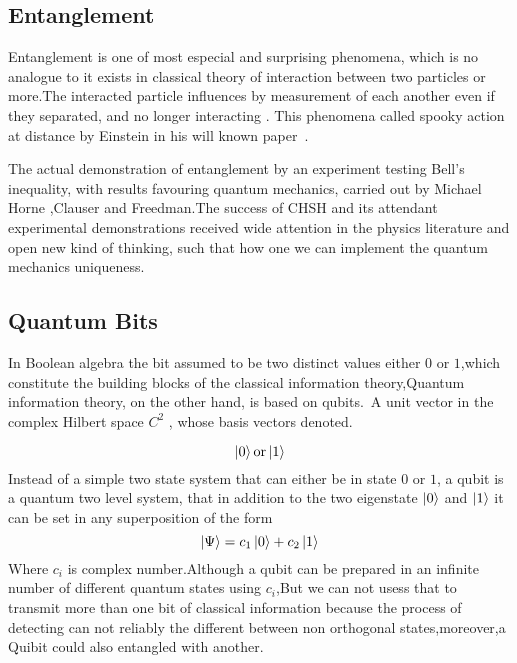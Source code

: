 \subsection{Entanglement}


Entanglement is one of most especial and surprising phenomena, which is no analogue to it exists in classical theory of  interaction between two particles or more\citep{PhysRevLett.78.5022}.The interacted particle influences by measurement of each another even if they separated,  and no longer interacting . This phenomena  called spooky action at distance by Einstein in his will known paper~\cite{EPR}.


The actual demonstration of entanglement by an experiment testing Bell’s inequality, with results favouring quantum mechanics, carried out by Michael Horne ,Clauser and Freedman\citep{PhysRevLett.23.880}.The success of CHSH and its attendant experimental demonstrations received wide attention in the physics literature and open new kind of thinking, such that how one we can implement the quantum mechanics uniqueness.
\subsection{Quantum Bits}

In Boolean algebra the bit assumed to be  two distinct values either $0 $ or $1$,which constitute the building blocks of the classical information theory,Quantum information theory, on the other hand, is based on qubits.\citep{nielsen2002quantum}~A unit vector in the  complex Hilbert space $C^2$ , whose basis vectors denoted.

\begin{equation}
\ket{0}\text{or}\ket{1}
\end{equation}
Instead of a simple two state system that can either be in state $0$ or $1$, a qubit is a quantum two level system, that in addition to the two eigenstate $\ket{0}$ and $\ket{1}$ it can be set in any superposition of the form
$$\ket{\Psi}=c_1\ket{0}+c_2\ket{1}$$
Where $c_i$ is complex number.Although a qubit can be prepared in an infinite number of different quantum states using $c_i$,But we can  not usess that to transmit more than one bit of classical information because the process of detecting can not reliably the different between non orthogonal states,moreover,a Quibit could also entangled with another.
